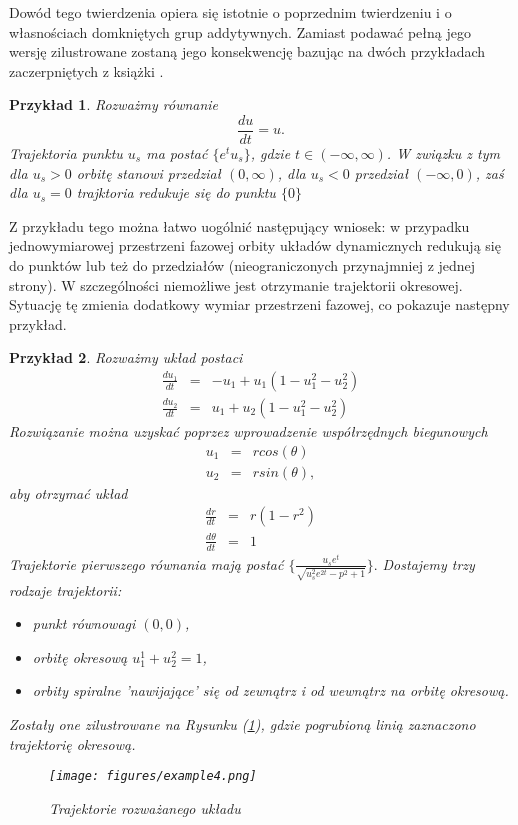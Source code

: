 \documentclass[12pt, twoside]{book}
\newtheorem{przyklad}{Przykład}
\begin{document}
Dowód tego twierdzenia opiera się istotnie o poprzednim twierdzeniu i o własnościach domkniętych grup addytywnych. Zamiast podawać pełną jego wersję zilustrowane zostaną jego konsekwencję bazując na dwóch przykładach zaczerpniętych z książki \cite{Palczewski}.
\begin{przyklad}
	Rozważmy równanie
	\begin{equation}
	\frac{du}{dt} = u.
	\end{equation}
	Trajektoria punktu $ u_{s} $ ma postać $ \{e^tu_{s}\} $, gdzie $ t \in (-\infty,\infty) $. W związku z tym dla $ u_{s} > 0 $ orbitę stanowi przedział $ (0,\infty) $, dla $ u_{s} < 0 $ przedział $ (-\infty,0) $, zaś dla $ u_{s} = 0 $ trajktoria redukuje się do punktu $ \{0\} $
\end{przyklad}
Z przykładu tego można łatwo uogólnić następujący wniosek: w przypadku jednowymiarowej przestrzeni fazowej orbity układów dynamicznych redukują się do punktów lub też do przedziałów (nieograniczonych przynajmniej z jednej strony). W szczególności niemożliwe jest otrzymanie trajektorii okresowej. Sytuację tę zmienia dodatkowy wymiar przestrzeni fazowej, co pokazuje następny przykład.
\begin{przyklad}
	Rozważmy układ postaci
	\begin{equation}
	\begin{array}{rcr} 
		\frac{du_{1}}{dt} & = & -u_{1} + u_{1}(1 - u_{1}^2 - u_{2}^2) \\ 
		\frac{du_{2}}{dt} & = & u_{1} + u_{2}(1 - u_{1}^2 - u_{2}^2)
		\end{array}
	\end{equation}
	Rozwiązanie można uzyskać poprzez wprowadzenie współrzędnych biegunowych
	\begin{equation}
	\begin{array}{rcr} 
	u_{1} & = & rcos(\theta) \\ 
	u_{2} & = & rsin(\theta),
	\end{array}
	\end{equation}
	aby otrzymać układ
	\begin{equation}
	\begin{array}{rcl} 
	\frac{dr}{dt} & = & r(1-r^2) \\ 
	\frac{d\theta}{dt} & = & 1
	\end{array}
	\end{equation}
	Trajektorie pierwszego równania mają postać $ \{\frac{u_{s}e^t}{\sqrt{u_{s}^2e^{2t}-p^2+1}}\}. $ Dostajemy trzy rodzaje trajektorii:
	\begin{itemize}
		\item punkt równowagi $ (0,0) $,
		\item orbitę okresową $ u_{1}^1 + u_{2}^2 = 1 $,
		\item orbity spiralne 'nawijające' się od zewnątrz i od wewnątrz na orbitę okresową.
	\end{itemize}
	Zostały one zilustrowane na Rysunku (\ref{Fig5}), gdzie pogrubioną linią zaznaczono trajektorię okresową.
	\begin{figure}[H]
		\texttt{[image: figures/example4.png]} 
		\centering
		\caption{Trajektorie rozważanego układu}
		\label{Fig5}
	\end{figure}
\end{przyklad}
\end{document}
